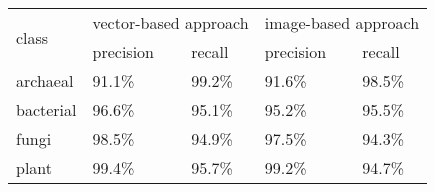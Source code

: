 \begin{table}[h]
\begin{tabular}{|l|l|l|l|l|}
\hline
\multirow{2}{*}{class} & \multicolumn{2}{l|}{vector-based approach} & \multicolumn{2}{l|}{image-based approach} \\ \cline{2-5} 
                       & precision             & recall             & precision             & recall            \\ \hline
archaeal               & 91.1\%                & 99.2\%             & 91.6\%                & 98.5\%            \\ \hline
bacterial              & 96.6\%                & 95.1\%             & 95.2\%                & 95.5\%            \\ \hline
fungi                  & 98.5\%                & 94.9\%             & 97.5\%                & 94.3\%            \\ \hline
plant                  & 99.4\%                & 95.7\%             & 99.2\%                & 94.7\%            \\ \hline
\end{tabular}
\end{table}